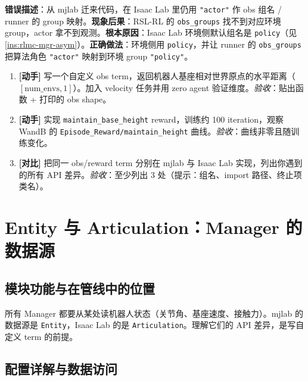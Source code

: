\begin{pitfall}
\textbf{错误描述}：从 mjlab 迁来代码，在 Isaac Lab 里仍用 \verb|"actor"| 作 obs 组名 / runner 的 group 映射。\textbf{现象后果}：RSL-RL 的 \verb|obs_groups| 找不到对应环境 group，actor 拿不到观测。\textbf{根本原因}：Isaac Lab 环境侧默认组名是 \verb|policy|（见 \cref{ins:rlmc-mgr-asym}）。\textbf{正确做法}：环境侧用 \verb|policy|，并让 runner 的 \verb|obs_groups| 把算法角色 \verb|"actor"| 映射到环境 group \verb|"policy"|。
\end{pitfall}

\begin{practice}[本节练习]
\begin{enumerate}
  \item \textbf{[动手]} 写一个自定义 obs term，返回机器人基座相对世界原点的水平距离（$[\text{num\_envs},1]$）。加入 velocity 任务并用 zero agent 验证维度。\emph{验收}：贴出函数 + 打印的 obs shape。
  \item \textbf{[动手]} 实现 \verb|maintain_base_height| reward，训练约 100 iteration，观察 WandB 的 \verb|Episode_Reward/maintain_height| 曲线。\emph{验收}：曲线非零且随训练变化。
  \item \textbf{[对比]} 把同一 obs/reward term 分别在 mjlab 与 Isaac Lab 实现，列出你遇到的所有 API 差异。\emph{验收}：至少列出 3 处（提示：组名、import 路径、终止项类名）。
\end{enumerate}
\end{practice}

\section{Entity 与 Articulation：Manager 的数据源}
\label{sec:rlmc-mgr-entity}

\subsection{模块功能与在管线中的位置}

所有 Manager 都要从某处读机器人状态（关节角、基座速度、接触力）。mjlab 的数据源是 \verb|Entity|，Isaac Lab 的是 \verb|Articulation|。理解它们的 API 差异，是写自定义 term 的前提。

\subsection{配置详解与数据访问}

